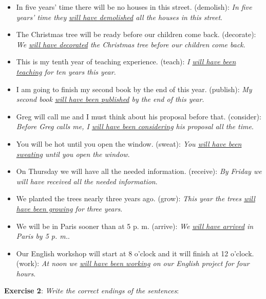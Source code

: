 \begin{itemize}

\item In five years' time there will be no houses in this street. (demolish): \textit{In five years' time they \underline{will have demolished} all the houses in this street}.
\item The Christmas tree will be ready before our children come back. (decorate): \newline\textit{We \underline{will have decorated} the Christmas tree before our children come back}.
\item This is my tenth year of teaching experience. (teach): \textit{I \underline{will have been teaching} for ten years this year}.
\item I am going to finish my second book by the end of this year. (publish): \textit{My second book \underline{will have been published} by the end of this year}.
\item Greg will call me and I must think about his proposal before that. (consider): \textit{Before Greg calls me, I \underline{will have been considering} his proposal all the time}.
\item You will be hot until you open the window. (sweat): \textit{You \underline{will have been sweating} until you open the window}.
\item On Thursday we will have all the needed information. (receive): \textit{By Friday we \textit{will have received} all the needed information}.
\item We planted the trees nearly three years ago. (grow): \newline \textit{This year the trees \underline{will have been growing} for three years}.
\item We will be in Paris sooner than at 5 p. m. (arrive): \textit{We \underline{will have arrived} in Paris by 5 p. m.}.
\item Our English workshop will start at 8 o'clock and it will finish at 12 o'clock. (work): \textit{At noon we \underline{will have been working} on our English project for four hours}.

\end{itemize}

\textbf{Exercise 2}: \textit{Write the correct endings of the sentences}:

